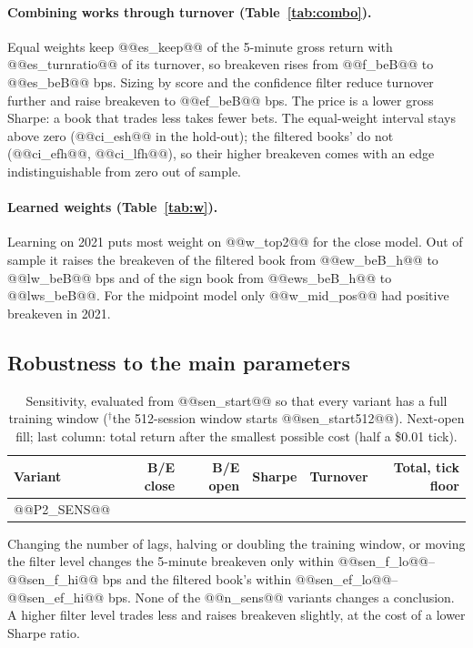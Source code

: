 \documentclass[11pt,a4paper]{article}
\begin{document}
\paragraph{Combining works through turnover (Table~\ref{tab:combo}).} Equal weights keep @@es_keep@@ of the
5-minute gross return with @@es_turnratio@@ of its turnover, so breakeven rises from @@f_beB@@ to @@es_beB@@
bps. Sizing by score and the confidence filter reduce turnover further and raise breakeven to
@@ef_beB@@ bps. The price is a lower gross Sharpe: a book that trades less takes fewer bets. The
equal-weight interval stays above zero (@@ci_esh@@ in the hold-out); the filtered books' do not (@@ci_efh@@,
@@ci_lfh@@), so their higher breakeven comes with an edge indistinguishable from zero out of sample.

\paragraph{Learned weights (Table~\ref{tab:w}).} Learning on 2021 puts most weight on @@w_top2@@ for
the close model. Out of sample it raises the breakeven of the filtered book from @@ew_beB_h@@ to @@lw_beB@@ bps
and of the sign book from @@ews_beB_h@@ to @@lws_beB@@. For the midpoint model only @@w_mid_pos@@ had positive
breakeven in 2021.

\subsection{Robustness to the main parameters}
\label{sec:sens}

\begin{table}[htbp]
\centering
\caption{Sensitivity, evaluated from @@sen_start@@ so that every variant has a full training window
($^{\dagger}$the 512-session window starts @@sen_start512@@). Next-open fill; last column: total return
after the smallest possible cost (half a \$0.01 tick).}
\label{tab:sens}
\footnotesize
\begin{tabular}{@{}lrrrrr@{}}
\toprule
Variant & B/E close & B/E open & Sharpe & Turnover & Total, tick floor \\
\midrule
@@P2_SENS@@
\bottomrule
\end{tabular}
\end{table}

Changing the number of lags, halving or doubling the training window, or moving the filter level changes
the 5-minute breakeven only within @@sen_f_lo@@--@@sen_f_hi@@ bps and the filtered book's within
@@sen_ef_lo@@--@@sen_ef_hi@@ bps. None of the @@n_sens@@ variants changes a conclusion. A higher filter level
trades less and raises breakeven slightly, at the cost of a lower Sharpe ratio.
\end{document}
